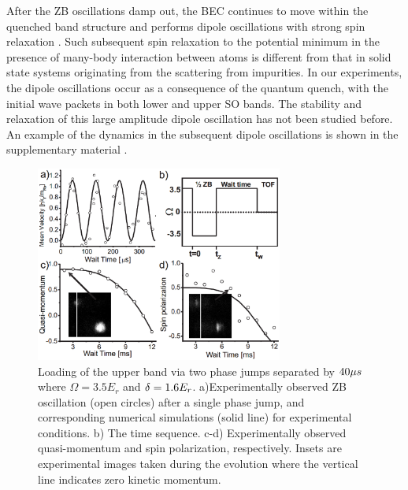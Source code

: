 \documentclass[prl,aps,twocolumn,showpacs,floatfix]{revtex4-1}
\begin{document}
After the ZB oscillations damp out, the BEC continues to move within the
quenched band structure and performs dipole oscillations \cite{Lin Synthetic
electric field,Pan - Collective Dipole modes} with strong spin relaxation
\cite{SI}. Such subsequent spin relaxation to the potential minimum in the
presence of many-body interaction between atoms is different from that in
solid state systems originating from the scattering from impurities. In our
experiments, the dipole oscillations occur as a consequence of the quantum
quench, with the initial wave packets in both lower and upper SO bands. The
stability and relaxation of this large amplitude dipole oscillation has not
been studied before. An example of the dynamics in the subsequent dipole
oscillations is shown in the supplementary material \cite{SI}.

\begin{figure}[tbp]
\centering
\includegraphics[width=3.2in]{Fig4QuPRL.eps}
\caption{Loading of the upper band via two phase jumps separated by $40{%
\protect\mu }s$ where $\Omega =3.5E_{r}$ and $\protect\delta =1.6E_{r}$.
a)Experimentally observed ZB oscillation (open circles) after a single phase
jump, and corresponding numerical simulations (solid line) for experimental
conditions. b) The time sequence. c-d) Experimentally observed
quasi-momentum and spin polarization, respectively. Insets are experimental
images taken during the evolution where the vertical line indicates zero
kinetic momentum.}
\label{fig-upper band}
\end{figure}
\end{document}
